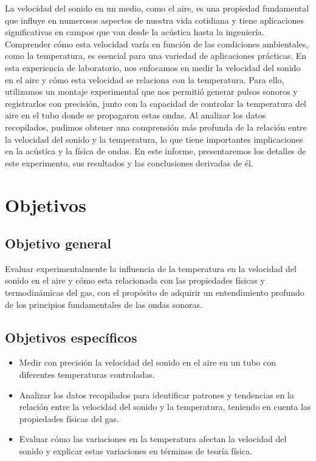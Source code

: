 \documentclass[twocolumn, 12pt]{article}
\begin{document}
La velocidad del sonido en un medio, como el aire, es una
propiedad fundamental que influye en numerosos aspectos de
nuestra vida cotidiana y tiene aplicaciones significativas
en campos que van desde la acústica hasta la ingeniería.
Comprender cómo esta velocidad varía en función de las
condiciones ambientales, como la temperatura, es esencial
para una variedad de aplicaciones prácticas. En esta
experiencia de laboratorio, nos enfocamos en medir la
velocidad del sonido en el aire y cómo esta velocidad se
relaciona con la temperatura. Para ello, utilizamos un
montaje experimental que nos permitió generar pulsos
sonoros y registrarlos con precisión, junto con la
capacidad de controlar la temperatura del aire en el tubo
donde se propagaron estas ondas. Al analizar los datos
recopilados, pudimos obtener una comprensión más profunda
de la relación entre la velocidad del sonido y la
temperatura, lo que tiene importantes implicaciones en la
acústica y la física de ondas. En este informe,
presentaremos los detalles de este experimento, sus
resultados y las conclusiones derivadas de él.

\section{Objetivos}

\subsection{Objetivo general}

Evaluar experimentalmente la influencia de la temperatura
en la velocidad del sonido en el aire y cómo esta
relacionada con las propiedades físicas y termodinámicas
del gas, con el propósito de adquirir un entendimiento
profundo de los principios fundamentales de las ondas
sonoras.

\subsection{Objetivos específicos}

\begin{itemize}[label=$\triangleright$]
    \item Medir con precisión la velocidad del sonido en el aire en
          un tubo con diferentes temperaturas controladas.

    \item Analizar los datos recopilados para identificar patrones y
          tendencias en la relación entre la velocidad del sonido y
          la temperatura, teniendo en cuenta las propiedades físicas
          del gas.

    \item Evaluar cómo las variaciones en la temperatura afectan la
          velocidad del sonido y explicar estas variaciones en
          términos de teoría física.
\end{itemize}
\end{document}
